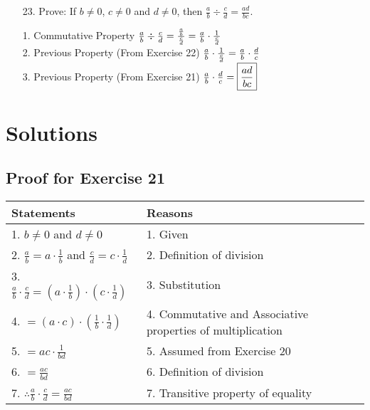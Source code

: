 \documentclass{article}
\begin{document}
\begin{enumerate}
    \item[23.] Prove: If $b \neq 0$, $c \neq 0$ and $d \neq 0$, then $\frac{a}{b} \div \frac{c}{d} = \frac{ad}{bc}$.

    \begin{minipage}[t][5cm][t]{\linewidth}
        1. Commutative Property
        $\\[8pt] \frac{a}{b} \div \frac{c}{d} = \frac{\frac{a}{b}}{\frac{c}{d}} = \frac{a}{b} \cdot \frac{1}{\frac{c}{d}}$
        \\[8pt] 2. Previous Property (From Exercise 22)
        $\\[8pt] \frac{a}{b} \cdot \frac{1}{\frac{c}{d}} = \frac{a}{b} \cdot \frac{d}{c}$
        \\[8pt] 3. Previous Property (From Exercise 21)
        $\\[8pt] \frac{a}{b} \cdot \frac{d}{c} = \boxed{\frac{ad}{bc}}$
    \end{minipage}
\end{enumerate}

\newpage

\section*{Solutions}

\subsection*{Proof for Exercise 21}
\begin{tabular}{l p{7cm}}
    \textbf{Statements} & \textbf{Reasons} \\
    \hline
    1. $b \neq 0$ and $d \neq 0$ & 1. Given \\
    2. $\frac{a}{b} = a \cdot \frac{1}{b}$ and $\frac{c}{d} = c \cdot \frac{1}{d}$ & 2. Definition of division \\
    3. $\frac{a}{b} \cdot \frac{c}{d} = \left(a \cdot \frac{1}{b}\right) \cdot \left(c \cdot \frac{1}{d}\right)$ & 3. Substitution \\
    4. $= (a \cdot c) \cdot \left(\frac{1}{b} \cdot \frac{1}{d}\right)$ & 4. Commutative and Associative properties of multiplication \\
    5. $= ac \cdot \frac{1}{bd}$ & 5. Assumed from Exercise 20 \\
    6. $= \frac{ac}{bd}$ & 6. Definition of division \\
    7. $\therefore \frac{a}{b} \cdot \frac{c}{d} = \frac{ac}{bd}$ & 7. Transitive property of equality \\
\end{tabular}
\end{document}
